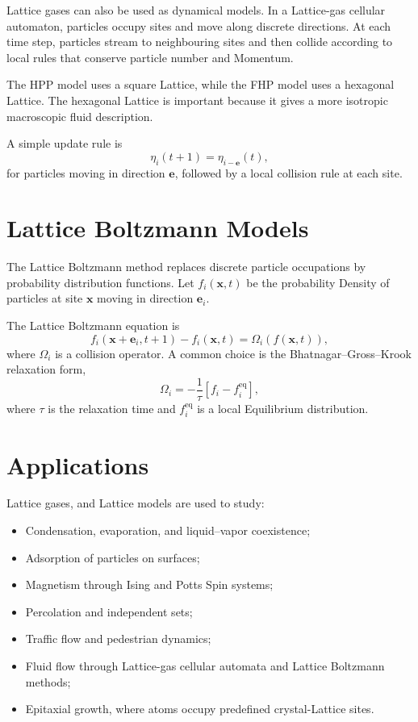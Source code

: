 \documentclass[a4paper, 10pt, onepage]{elegantbook}
\begin{document}
{Lattice gases can also be used as dynamical models. In a Lattice-gas cellular
automaton, particles occupy sites and move along discrete directions. At each
time step, particles stream to neighbouring sites and then collide according to
local rules that conserve particle number and Momentum.

The HPP model uses a square Lattice, while the FHP model uses a hexagonal
Lattice. The hexagonal Lattice is important because it gives a more isotropic
macroscopic fluid description.

A simple update rule is
\[
\eta_i(t+1)
=
\eta_{i-\mathbf e}(t),
\]
for particles moving in direction \(\mathbf e\), followed by a local collision
rule at each site.

\section{Lattice Boltzmann Models}

The Lattice Boltzmann method replaces discrete particle occupations by
probability distribution functions. Let \(f_i(\mathbf x,t)\) be the probability
Density of particles at site \(\mathbf x\) moving in direction \(\mathbf e_i\).

The Lattice Boltzmann equation is
\[
f_i(\mathbf x+\mathbf e_i,t+1)-f_i(\mathbf x,t)
=
\Omega_i(f(\mathbf x,t)),
\]
where \(\Omega_i\) is a collision operator. A common choice is the
Bhatnagar--Gross--Krook relaxation form,
\[
\Omega_i
=
-\frac{1}{\tau}
\left[
f_i-f_i^{\mathrm{eq}}
\right],
\]
where \(\tau\) is the relaxation time and \(f_i^{\mathrm{eq}}\) is a local
Equilibrium distribution.

\section*{Applications}

Lattice gases, and Lattice models are used to study:

\begin{itemize}
\item Condensation, evaporation, and liquid--vapor coexistence;
\item Adsorption of particles on surfaces;
\item Magnetism through Ising and Potts Spin systems;
\item Percolation and independent sets;
\item Traffic flow and pedestrian dynamics;
\item Fluid flow through Lattice-gas cellular automata and Lattice Boltzmann methods;
\item Epitaxial growth, where atoms occupy predefined crystal-Lattice sites.
\end{itemize}

}
\end{document}
